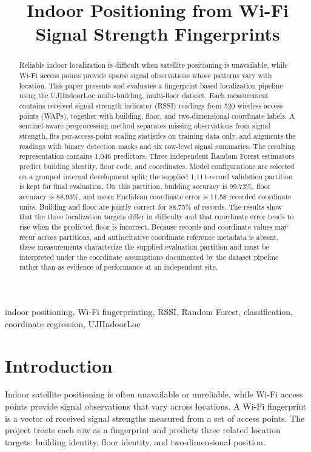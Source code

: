 \documentclass[conference]{IEEEtran}
\title{Indoor Positioning from Wi-Fi Signal Strength Fingerprints}
\author{}
\date{}
\begin{document}
\maketitle
\begin{abstract}
Reliable indoor localization is difficult when satellite positioning is unavailable, while Wi-Fi access points provide sparse signal observations whose patterns vary with location. This paper presents and evaluates a fingerprint-based localization pipeline using the UJIIndoorLoc multi-building, multi-floor dataset. Each measurement contains received signal strength indicator (RSSI) readings from 520 wireless access points (WAPs), together with building, floor, and two-dimensional coordinate labels. A sentinel-aware preprocessing method separates missing observations from signal strength, fits per-access-point scaling statistics on training data only, and augments the readings with binary detection masks and six row-level signal summaries. The resulting representation contains 1,046 predictors. Three independent Random Forest estimators predict building identity, floor code, and coordinates. Model configurations are selected on a grouped internal development split; the supplied 1,111-record validation partition is kept for final evaluation. On this partition, building accuracy is 99.73\%, floor accuracy is 88.93\%, and mean Euclidean coordinate error is 11.58 recorded coordinate units. Building and floor are jointly correct for 88.75\% of records. The results show that the three localization targets differ in difficulty and that coordinate error tends to rise when the predicted floor is incorrect. Because records and coordinate values may recur across partitions, and authoritative coordinate reference metadata is absent, these measurements characterize the supplied evaluation partition and must be interpreted under the coordinate assumptions documented by the dataset pipeline rather than as evidence of performance at an independent site.
\end{abstract}
\begin{IEEEkeywords}
indoor positioning, Wi-Fi fingerprinting, RSSI, Random Forest, classification, coordinate regression, UJIIndoorLoc
\end{IEEEkeywords}

\section{Introduction}
Indoor satellite positioning is often unavailable or unreliable, while Wi-Fi access points provide signal observations that vary across locations. A Wi-Fi fingerprint is a vector of received signal strengths measured from a set of access points. The project treats each row as a fingerprint and predicts three related location targets: building identity, floor identity, and two-dimensional position.
\end{document}
